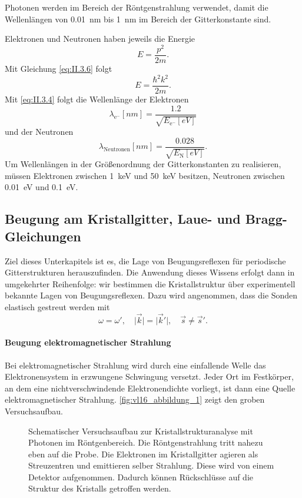 	Photonen werden im Bereich der Röntgenstrahlung verwendet, damit die Wellenlängen von \SI{0,01}{\nano \meter} bis \SI{1}{\nano\meter} im Bereich der Gitterkonstante sind. 
	
	Elektronen und Neutronen haben jeweils die Energie
	$$
	E = \frac{p^2}{2m}.
	$$ 
	Mit Gleichung \eqref{eq:II.3.6} folgt
	$$
	E = \frac{\hbar ^2 k^2}{2m}.
	$$
	Mit \eqref{eq:II.3.4} folgt die Wellenlänge der Elektronen
	\begin{equation}
		\label{eq:II.3.8}
		\lambda_{\mathrm{e}^{-}} [\unit{nm}]= \frac{\num{1,2}}{\sqrt{E_{\mathrm{e}^{-}} [\unit{eV}]} }
	\end{equation}
	und der Neutronen
	$$
	\lambda_{\mathrm{Neutronen}} [\unit{nm}] = \frac{\num{0,028}}{\sqrt{E_{\mathrm{N}} [\unit{eV}]} }.
	$$ 
	Um Wellenlängen in der Größenordnung der Gitterkonstanten zu realisieren, müssen Elektronen zwischen \SI{1}{\kilo \electronvolt} und \SI{50}{\kilo \electronvolt} besitzen, Neutronen zwischen \SI{0,01}{\electronvolt} und \SI{0,1}{\electronvolt}.

\subsection{Beugung am Kristallgitter, Laue- und Bragg-Gleichungen}
	Ziel dieses Unterkapitels ist es, die Lage von Beugungsreflexen für periodische Gitterstrukturen herauszufinden. 
	Die Anwendung dieses Wissens erfolgt dann in umgekehrter Reihenfolge: 
	wir bestimmen die Kristallstruktur über experimentell bekannte Lagen von Beugungsreflexen.
	Dazu wird angenommen, dass die Sonden elastisch gestreut werden mit
	\begin{equation}
		\label{eq:II.3.10}
		\omega = \omega', \quad  \big|\Vec{k} \big| =  \big| \Vec{k}' \big|, \quad \Vec{s} \neq \Vec{s}'.
	\end{equation}

\paragraph{Beugung elektromagnetischer Strahlung}
	Bei elektromagnetischer Strahlung wird durch eine einfallende Welle das Elektronensystem in erzwungene Schwingung versetzt.
	Jeder Ort im Festkörper, an dem eine nichtverschwindende Elektronendichte vorliegt, ist dann eine Quelle elektromagnetischer Strahlung.
	\autoref{fig:vl16_abbildung_1} zeigt den groben Versuchsaufbau.

	\begin{figure}[H]
		\centering
		\caption{Schematischer Versuchsaufbau zur Kristallstrukturanalyse mit Photonen im Röntgenbereich. 
			Die Röntgenstrahlung tritt nahezu eben auf die Probe. 
			Die Elektronen im Kristallgitter agieren als Streuzentren und emittieren selber Strahlung.
			Diese wird von einem Detektor aufgenommen.
			Dadurch können Rückschlüsse auf die Struktur des Kristalls getroffen werden.
		}
		\label{fig:vl16_abbildung_1}
	\end{figure}


